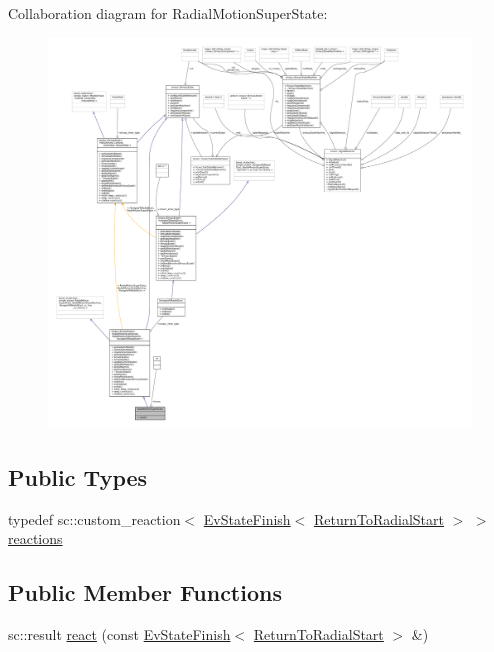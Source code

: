 Collaboration diagram for Radial\+Motion\+Super\+State\+:
\nopagebreak
\begin{figure}[H]
\begin{center}
\leavevmode
\includegraphics[width=350pt]{structRadialMotionSuperState__coll__graph}
\end{center}
\end{figure}
\subsection*{Public Types}
\begin{DoxyCompactItemize}
\item 
typedef sc\+::custom\+\_\+reaction$<$ \hyperlink{structsmacc_1_1EvStateFinish}{Ev\+State\+Finish}$<$ \hyperlink{structReturnToRadialStart}{Return\+To\+Radial\+Start} $>$ $>$ \hyperlink{structRadialMotionSuperState_a6794c75ce7726b0ceae0d49fe61668be}{reactions}
\end{DoxyCompactItemize}
\subsection*{Public Member Functions}
\begin{DoxyCompactItemize}
\item 
sc\+::result \hyperlink{structRadialMotionSuperState_ad92e6f82cd66e4d69d120c73f9a600f4}{react} (const \hyperlink{structsmacc_1_1EvStateFinish}{Ev\+State\+Finish}$<$ \hyperlink{structReturnToRadialStart}{Return\+To\+Radial\+Start} $>$ \&)
\end{DoxyCompactItemize}
